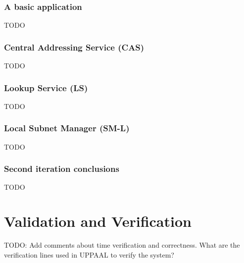 \subsubsection{A basic application}
TODO
\subsubsection{Central Addressing Service (CAS)}
TODO
\subsubsection{Lookup Service (LS)}
TODO
\subsubsection{Local Subnet Manager (SM-L)}
TODO
\subsubsection{Second iteration conclusions}
TODO

\section{Validation and Verification}
TODO: Add comments about time verification and correctness. What are the
verification lines used in UPPAAL to verify the system?

